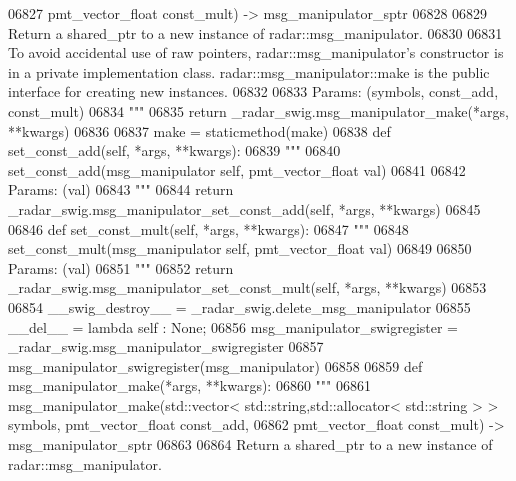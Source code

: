 \begin{DoxyCode}
{{{{{{{{{{{{{{{{{{{{{{{06827 \textcolor{stringliteral}{            pmt\_vector\_float const\_mult) -> msg\_manipulator\_sptr}
06828 \textcolor{stringliteral}{}
06829 \textcolor{stringliteral}{        Return a shared\_ptr to a new instance of radar::msg\_manipulator.}
06830 \textcolor{stringliteral}{}
06831 \textcolor{stringliteral}{        To avoid accidental use of raw pointers, radar::msg\_manipulator's constructor is in a private
       implementation class. radar::msg\_manipulator::make is the public interface for creating new instances.}
06832 \textcolor{stringliteral}{}
06833 \textcolor{stringliteral}{        Params: (symbols, const\_add, const\_mult)}
06834 \textcolor{stringliteral}{        """}
06835         \textcolor{keywordflow}{return} \_radar\_swig.msg\_manipulator\_make(*args, **kwargs)
06836 
06837     make = staticmethod(make)
06838     \textcolor{keyword}{def }set_const_add(self, *args, **kwargs):
06839         \textcolor{stringliteral}{"""}
06840 \textcolor{stringliteral}{        set\_const\_add(msg\_manipulator self, pmt\_vector\_float val)}
06841 \textcolor{stringliteral}{}
06842 \textcolor{stringliteral}{        Params: (val)}
06843 \textcolor{stringliteral}{        """}
06844         \textcolor{keywordflow}{return} \_radar\_swig.msg\_manipulator\_set\_const\_add(self, *args, **kwargs)
06845 
06846     \textcolor{keyword}{def }set_const_mult(self, *args, **kwargs):
06847         \textcolor{stringliteral}{"""}
06848 \textcolor{stringliteral}{        set\_const\_mult(msg\_manipulator self, pmt\_vector\_float val)}
06849 \textcolor{stringliteral}{}
06850 \textcolor{stringliteral}{        Params: (val)}
06851 \textcolor{stringliteral}{        """}
06852         \textcolor{keywordflow}{return} \_radar\_swig.msg\_manipulator\_set\_const\_mult(self, *args, **kwargs)
06853 
06854     \_\_swig\_destroy\_\_ = \_radar\_swig.delete\_msg\_manipulator
06855     \_\_del\_\_ = \textcolor{keyword}{lambda} self : \textcolor{keywordtype}{None};
06856 msg\_manipulator\_swigregister = \_radar\_swig.msg\_manipulator\_swigregister
06857 msg_manipulator_swigregister(msg\_manipulator)
06858 
06859 \textcolor{keyword}{def }msg_manipulator_make(*args, **kwargs):
06860   \textcolor{stringliteral}{"""}
06861 \textcolor{stringliteral}{    msg\_manipulator\_make(std::vector< std::string,std::allocator< std::string > > symbols, pmt\_vector\_float
       const\_add, }
06862 \textcolor{stringliteral}{        pmt\_vector\_float const\_mult) -> msg\_manipulator\_sptr}
06863 \textcolor{stringliteral}{}
06864 \textcolor{stringliteral}{    Return a shared\_ptr to a new instance of radar::msg\_manipulator.}
}}}}}}}}}}}}}}}}}}}}}}}
\end{DoxyCode}
